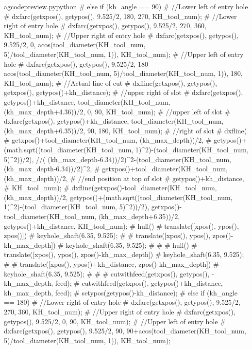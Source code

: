 \documentclass{ltxdoc}
\begin{document}
\begin{writecode}{a}{gcodepreview.py}{python}
{#  } else if (kh_angle == 90) {
#    //Lower left of entry hole
#    dxfarc(getxpos(), getypos(), 9.525/2, 180, 270, KH_tool_num);
#    //Lower right of entry hole
#    dxfarc(getxpos(), getypos(), 9.525/2, 270, 360, KH_tool_num);
#    //Upper right of entry hole
#    dxfarc(getxpos(), getypos(), 9.525/2, 0, acos(tool_diameter(KH_tool_num, 5)/tool_diameter(KH_tool_num, 1)), KH_tool_num);
#    //Upper left of entry hole
#    dxfarc(getxpos(), getypos(), 9.525/2, 180-acos(tool_diameter(KH_tool_num, 5)/tool_diameter(KH_tool_num, 1)), 180, KH_tool_num);
#    //Actual line of cut
#    dxfline(getxpos(), getypos(), getxpos(), getypos()+kh_distance);
#    //upper right of slot
#    dxfarc(getxpos(), getypos()+kh_distance, tool_diameter(KH_tool_num, (kh_max_depth+4.36))/2, 0, 90, KH_tool_num);
#    //upper left of slot
#    dxfarc(getxpos(), getypos()+kh_distance, tool_diameter(KH_tool_num, (kh_max_depth+6.35))/2, 90, 180, KH_tool_num);
#    //right of slot
#    dxfline(
#        getxpos()+tool_diameter(KH_tool_num, (kh_max_depth))/2, 
#        getypos()+(math.sqrt((tool_diameter(KH_tool_num, 1)^2)-(tool_diameter(KH_tool_num, 5)^2))/2), //( (kh_max_depth-6.34))/2)^2-(tool_diameter(KH_tool_num, (kh_max_depth-6.34))/2)^2, 
#        getxpos()+tool_diameter(KH_tool_num, (kh_max_depth))/2, 
#    //end position at top of slot
#        getypos()+kh_distance, 
#        KH_tool_num);
#    dxfline(getxpos()-tool_diameter(KH_tool_num, (kh_max_depth))/2, getypos()+(math.sqrt((tool_diameter(KH_tool_num, 1)^2)-(tool_diameter(KH_tool_num, 5)^2))/2), getxpos()-tool_diameter(KH_tool_num, (kh_max_depth+6.35))/2, getypos()+kh_distance, KH_tool_num);
#    hull(){
#      translate([xpos(), ypos(), zpos()]){
#        keyhole_shaft(6.35, 9.525);
#      }
#      translate([xpos(), ypos(), zpos()-kh_max_depth]){
#        keyhole_shaft(6.35, 9.525);
#      }
#    }
#    hull(){
#      translate([xpos(), ypos(), zpos()-kh_max_depth]){
#        keyhole_shaft(6.35, 9.525);
#      }
#      translate([xpos(), ypos()+kh_distance, zpos()-kh_max_depth]){
#        keyhole_shaft(6.35, 9.525);
#      }
#    }
#    cutwithfeed(getxpos(), getypos(), -kh_max_depth, feed);
#    cutwithfeed(getxpos(), getypos()+kh_distance, -kh_max_depth, feed);
#    setypos(getypos()-kh_distance);
#  } else if (kh_angle == 180) {
#    //Lower right of entry hole
#    dxfarc(getxpos(), getypos(), 9.525/2, 270, 360, KH_tool_num);
#    //Upper right of entry hole
#    dxfarc(getxpos(), getypos(), 9.525/2, 0, 90, KH_tool_num);
#    //Upper left of entry hole
#    dxfarc(getxpos(), getypos(), 9.525/2, 90, 90+acos(tool_diameter(KH_tool_num, 5)/tool_diameter(KH_tool_num, 1)), KH_tool_num);
}
\end{writecode}
\end{document}
